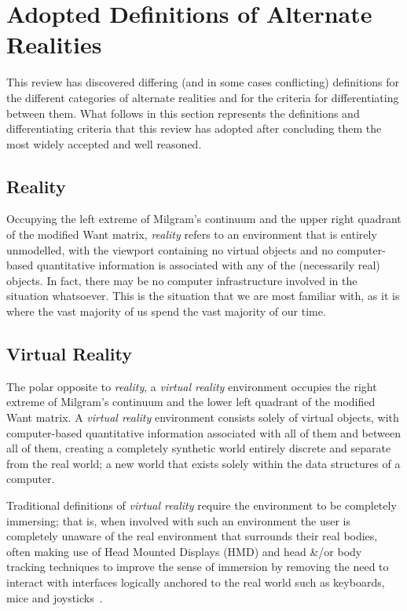
\section{Adopted Definitions of Alternate Realities}
\label{sec:definitions_of_alternate_realities}
This review has discovered differing (and in some cases conflicting) definitions for the different categories of alternate realities and for the criteria for differentiating between them. What follows in this section represents the definitions and differentiating criteria that this review has adopted after concluding them the most widely accepted and well reasoned.

\subsection{Reality}
Occupying the left extreme of Milgram's continuum and the upper right quadrant of the modified Want matrix, \textit{reality} refers to an environment that is entirely unmodelled, with the viewport containing no virtual objects and no computer-based quantitative information is associated with any of the (necessarily real) objects. In fact, there may be no computer infrastructure involved in the situation whatsoever. This is the situation that we are most familiar with, as it is where the vast majority of us spend the vast majority of our time.

\subsection{Virtual Reality}
The polar opposite to \textit{reality}, a \textit{virtual reality} environment occupies the right extreme of Milgram's continuum and the lower left quadrant of the modified Want matrix. A \textit{virtual reality} environment consists solely of virtual objects, with computer-based quantitative information associated with all of them and between all of them, creating a completely synthetic world entirely discrete and separate from the real world; a new world that exists solely within the data structures of a computer.%

Traditional definitions of \textit{virtual reality} require the environment to be completely immersing; that is, when involved with such an environment the user is completely unaware of the real environment that surrounds their real bodies, often making use of Head Mounted Displays (HMD) and head \&/or body tracking techniques to improve the sense of immersion by removing the need to interact with interfaces logically anchored to the real world such as keyboards, mice and joysticks~\cite{Druck2006}.

